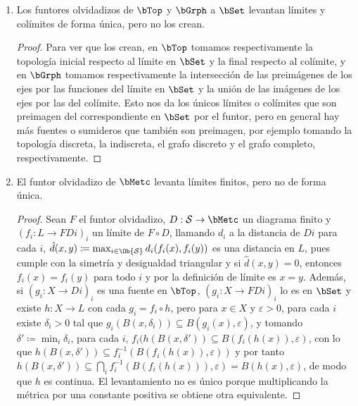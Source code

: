 \begin{example}
\begin{enumerate}
\begin{proof}
      El caso de $R\dash\bMod$ se puede reducir al anterior convirtiendo el
      producto por elementos de $R$ una cantidad potencialmente infinita de
      operaciones de aridad 1 en el módulo y convirtiendo cada instancia de una
      propiedad de este producto en una igualdad en la lista de igualdades, y
      usando que esta prueba no depende de que el número de operaciones e
      igualdades sea finito.
    \end{proof}
  \item Los funtores olvidadizos de $\bTop$ y $\bGrph$ a $\bSet$ levantan
    límites y colímites de forma única, pero no los crean.
    \begin{proof}
      Para ver que los crean, en $\bTop$ tomamos respectivamente la topología
      inicial respecto al límite en $\bSet$ y la final respecto al colímite, y
      en $\bGrph$ tomamos respectivamente la intersección de las preimágenes de
      los ejes por las funciones del límite en $\bSet$ y la unión de las
      imágenes de los ejes por las del colímite. Esto nos da los únicos límites
      o colímites que son preimagen del correspondiente en $\bSet$ por el
      funtor, pero en general hay más fuentes o sumideros que también son
      preimagen, por ejemplo tomando la topología discreta, la indiscreta, el
      grafo discreto y el grafo completo, respectivamente.
    \end{proof}
  \item El funtor olvidadizo de $\bMetc$ levanta límites finitos, pero no de
    forma única.
    \begin{proof}
      Sean $F$ el funtor olvidadizo, $D:\cS\to\bMetc$ un diagrama finito y
      $(f_i:L\to FDi)_i$ un límite de $F\circ D$, llamando $d_i$ a la distancia
      de $Di$ para cada $i$,
      $\hat d(x,y)\coloneqq\max_{i\in\Ob{\cS}}d_i(f_i(x),f_i(y))$ es una
      distancia en $L$, pues cumple con la simetría y desigualdad triangular y
      si $\hat d(x,y)=0$, entonces $f_i(x)=f_i(y)$ para todo $i$ y por la
      definición de límite es $x=y$. Además, si $(g_i:X\to Di)_i$ es una fuente
      en $\bTop$, $(g_i:X\to FDi)_i$ lo es en $\bSet$ y existe $h:X\to L$ con
      cada $g_i=f_i\circ h$, pero para $x\in X$ y $\varepsilon>0$, para cada $i$
      existe $\delta_i>0$ tal que
      $g_i(B(x,\delta_i))\subseteq B(g_i(x),\varepsilon)$, y tomando
      $\delta'\coloneqq\min_i\delta_i$, para cada $i$,
      $f_i(h(B(x,\delta'))\subseteq B(f_i(h(x)),\varepsilon)$, con lo que
      $h(B(x,\delta'))\subseteq f_i^{-1}(B(f_i(h(x)),\varepsilon))$ y por tanto
      $h(B(x,\delta'))\subseteq\bigcap_i f_i^{-1}(B(f_i(h(x))),\varepsilon)=
      B(h(x),\varepsilon)$, de modo que $h$ es continua. El levantamiento no es
      único porque multiplicando la métrica por una constante positiva se
      obtiene otra equivalente.
    \end{proof}
  \end{enumerate}
\end{example}


